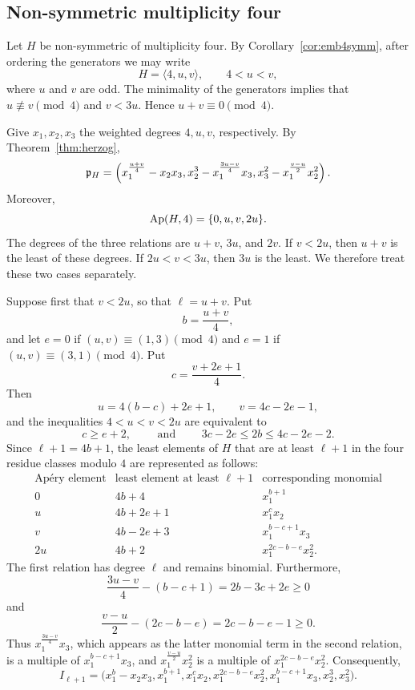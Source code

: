 \subsection{Non-symmetric multiplicity four}
\label{subsec:nonsymmetric-multiplicity-four}

Let $H$ be non-symmetric of multiplicity four.  By
Corollary~\ref{cor:emb4symm}, after ordering the generators we may write
\[
 H=\langle4,u,v\rangle,
 \qquad 4<u<v,
\]
where $u$ and $v$ are odd.  The minimality of the generators implies that
$u\not\equiv v\pmod4$ and $v<3u$.  Hence $u+v\equiv0\pmod4$.

Give $x_1,x_2,x_3$ the weighted degrees $4,u,v$, respectively.  By
Theorem~\ref{thm:herzog},
\[
 \mathfrak{p}_H=\left(
 x_1^{\frac{u+v}{4}}-x_2x_3,
 x_2^3-x_1^{\frac{3u-v}{4}}x_3,
 x_3^2-x_1^{\frac{v-u}{2}}x_2^2
\right).
\]
Moreover,
\[
 \operatorname{Ap}(H,4)=\{0,u,v,2u\}.
\]
The degrees of the three relations are $u+v$, $3u$, and $2v$.  If
$v<2u$, then $u+v$ is the least of these degrees.  If $2u<v<3u$, then
$3u$ is the least.  We therefore treat these two cases separately.

Suppose first that $v<2u$, so that $\ell=u+v$.  Put
\[
 b=\frac{u+v}{4},
\]
and let $e=0$ if $(u,v)\equiv(1,3)\pmod4$ and $e=1$ if
$(u,v)\equiv(3,1)\pmod4$.  Put
\[
 c=\frac{v+2e+1}{4}.
\]
Then
\[
 u=4(b-c)+2e+1,
 \qquad v=4c-2e-1,
\]
and the inequalities $4<u<v<2u$ are equivalent to
\[
 c\geq e+2, \qquad \text{ and }
 \qquad 3c-2e\leq2b\leq4c-2e-2.
\]
Since $\ell+1=4b+1$, the least elements of $H$ that are at least
$\ell+1$ in the four residue classes modulo $4$ are represented as follows:
\[
\begin{array}{c|c|c}
 \text{Ap\'ery element}&\text{least element at least }\ell+1
   &\text{corresponding monomial}\\ \hline
 0&4b+4&x_1^{b+1}\\
 u&4b+2e+1&x_1^cx_2\\
 v&4b-2e+3&x_1^{b-c+1}x_3\\
 2u&4b+2&x_1^{2c-b-e}x_2^2.
\end{array}
\]
The first relation has degree $\ell$ and remains binomial.  Furthermore,
\[
 \frac{3u-v}{4}-(b-c+1)=2b-3c+2e\geq0
\]
and
\[
 \frac{v-u}{2}-(2c-b-e)=2c-b-e-1\geq0.
\]
Thus $x_1^{\frac{3u-v}{4}}x_3$, which appears as the latter monomial term in the second relation, is a multiple
of $x_1^{b-c+1}x_3$, and $x_1^{\frac{v-u}{2}}x_2^2$ is a multiple of $x_1^{2c-b-e}x_2^2$.  Consequently,
\[
 I_{\ell+1}=\bigl(
 x_1^b-x_2x_3,
 x_1^{b+1},
 x_1^cx_2,
 x_1^{2c-b-e}x_2^2,
 x_1^{b-c+1}x_3,
 x_2^3,
 x_3^2
 \bigr).
\]

